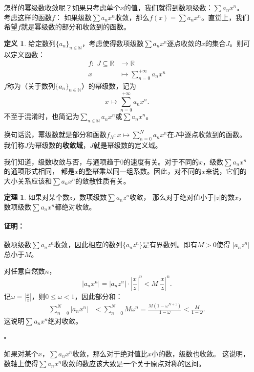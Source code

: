 \documentclass[12pt,UTF8]{ctexbook}
\theoremstyle{definition}
\newtheorem{df}{定义}[section]
\newtheorem{tm}{定理}[section]
\theoremstyle{plain}
\renewenvironment{proof}{\paragraph{\textbf{证明：}}}{\hfill$\square$}
\begin{document}
怎样的幂级数收敛呢？如果只考虑单个$x$的值，我们就得到数项级数：$\sum a_n x^n$。考虑这样的函数$f$：
如果级数$\sum a_n x^n$收敛，那么$f(x) = \sum a_n x^n$。直觉上，我们希望$f$就是幂级数的部分和收敛到的函数。

\begin{df}
    给定数列$\{a_n\}_{n\in\mathbb{N}}$，考虑使得数项级数$\sum a_n x^n$逐点收敛的$x$的集合$J$。则可以定义函数：
    $$
    \begin{array}{rl}
        f: \,\, J\subseteq\mathbb{R} &\rightarrow \mathbb{R} \\
        x &\displaystyle \mapsto \sum_{n=0}^{+\infty} a_n x^n        
    \end{array}
    $$
    $f$称为（关于数列$\{a_n\}_{n\in\mathbb{N}}$）的幂级数，记为
    $$ x\mapsto \sum_{n=0}^{+\infty} a_n x^n. $$
    不至于混淆时，也简记为$\sum_{n\in\mathbb{N}} a_n x^n$或$\sum a_n x^n$。
\end{df}
换句话说，幂级数就是部分和函数$f_N : x\mapsto \sum_{n=0}^{N} a_n x^n$在$J$中逐点收敛到的函数。
我们称$J$为幂级数的\textbf{收敛域}，$J$就是幂级数的定义域。

我们知道，级数收敛与否，与通项趋于$0$的速度有关。对于不同的$x$，级数$\sum a_n x^n$的通项形式相同，
都是$x$的整幂乘以同一组系数。因此，对不同的$x$来说，它们的大小关系应该和$\sum a_n x^n$的敛散性质有关。

\begin{tm}\label{tm:1-1-0}
    如果对某个数$z$，数项级数$\sum a_n z^n$收敛，
    那么对于绝对值小于$|z|$的数$x$，数项级数$\sum a_n x^n$都绝对收敛。
\end{tm}

\begin{proof}
    数项级数$\sum a_n z^n$收敛，因此相应的数列$\{a_n z^n\}$是有界数列。即有$M>0$使得
    $|a_n z^n|$总小于$M$。

    对任意自然数$n$，
    $$ |a_n x^n| = |a_n z^n| \cdot \left|\frac{x}{z}\right|^n < M \left|\frac{x}{z}\right|^n. $$
    记$\displaystyle \omega = \left|\frac{x}{z}\right|$，则$0\leqslant \omega<1$，因此部分和：
    \begin{align*}
        \sum_{n=0}^N |a_n x^n| &< \sum_{n=0}^N M \omega^n = \frac{M(1 - \omega^{N+1})}{1 - \omega} < \frac{M}{1 - \omega}.
    \end{align*}
    这说明$\sum a_n x^n$绝对收敛。

\end{proof}

如果对某个$x$，$\sum a_n x^n$收敛，那么对于绝对值比$x$小的数，级数也收敛。
这说明，数轴上使得$\sum a_n x^n$收敛的数应该大致是一个关于原点对称的区间。
\end{document}
